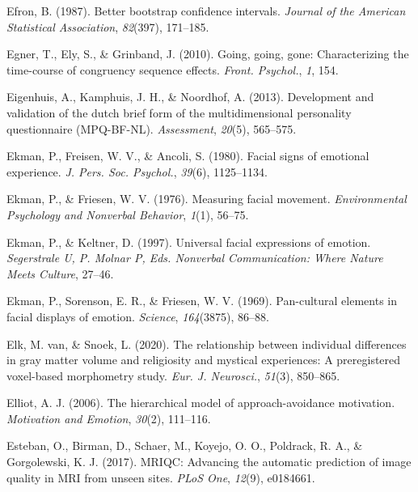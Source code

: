 \documentclass[12pt,american,a4paper,oneside,]{memoir} %
\begin{document}
\leavevmode\hypertarget{ref-efron1987better}{}%
Efron, B. (1987). Better bootstrap confidence intervals. \emph{Journal of the American Statistical Association}, \emph{82}(397), 171--185.

\leavevmode\hypertarget{ref-Egner2010-ot}{}%
Egner, T., Ely, S., \& Grinband, J. (2010). Going, going, gone: Characterizing the time-course of congruency sequence effects. \emph{Front. Psychol.}, \emph{1}, 154.

\leavevmode\hypertarget{ref-Eigenhuis2013-xo}{}%
Eigenhuis, A., Kamphuis, J. H., \& Noordhof, A. (2013). Development and validation of the dutch brief form of the multidimensional personality questionnaire (MPQ-BF-NL). \emph{Assessment}, \emph{20}(5), 565--575.

\leavevmode\hypertarget{ref-Ekman1980-of}{}%
Ekman, P., Freisen, W. V., \& Ancoli, S. (1980). Facial signs of emotional experience. \emph{J. Pers. Soc. Psychol.}, \emph{39}(6), 1125--1134.

\leavevmode\hypertarget{ref-Ekman1976-hm}{}%
Ekman, P., \& Friesen, W. V. (1976). Measuring facial movement. \emph{Environmental Psychology and Nonverbal Behavior}, \emph{1}(1), 56--75.

\leavevmode\hypertarget{ref-Ekman1997-bk}{}%
Ekman, P., \& Keltner, D. (1997). Universal facial expressions of emotion. \emph{Segerstrale U, P. Molnar P, Eds. Nonverbal Communication: Where Nature Meets Culture}, 27--46.

\leavevmode\hypertarget{ref-Ekman1969-pu}{}%
Ekman, P., Sorenson, E. R., \& Friesen, W. V. (1969). Pan-cultural elements in facial displays of emotion. \emph{Science}, \emph{164}(3875), 86--88.

\leavevmode\hypertarget{ref-Van_Elk2020-xo}{}%
Elk, M. van, \& Snoek, L. (2020). The relationship between individual differences in gray matter volume and religiosity and mystical experiences: A preregistered voxel-based morphometry study. \emph{Eur. J. Neurosci.}, \emph{51}(3), 850--865.

\leavevmode\hypertarget{ref-elliot2006hierarchical}{}%
Elliot, A. J. (2006). The hierarchical model of approach-avoidance motivation. \emph{Motivation and Emotion}, \emph{30}(2), 111--116.

\leavevmode\hypertarget{ref-Esteban2017-mv}{}%
Esteban, O., Birman, D., Schaer, M., Koyejo, O. O., Poldrack, R. A., \& Gorgolewski, K. J. (2017). MRIQC: Advancing the automatic prediction of image quality in MRI from unseen sites. \emph{PLoS One}, \emph{12}(9), e0184661.
\end{document}
